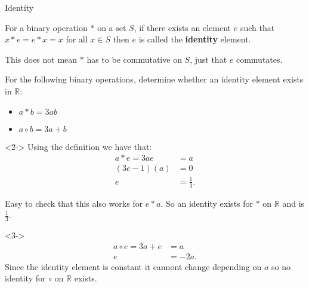 \documentclass[8pt]{beamer}
\newcommand{\R}{\mathbb{R}}
\begin{document}
\begin{frame}[shrink]{Identity}
	\begin{definition}
		For a binary operation $*$ on a set  $S$, if there exists an element $e$ such that $x*e=e*x=x$ for all  $x\in S$ then $e $ is called the \textbf{identity} element. 
	\end{definition}

	\alert<1>{This does not mean $*$ has to be commutative on  $S$, just that  $e$ commutates.}

\begin{problem}
	For the following binary operations, determine whether an identity element exists in $\R$:
	\begin{itemize}
		\item $a*b= 3ab$
		\item  $ a \circ b = 3a+b$
	\end{itemize}

\end{problem}

\begin{solution}<2->
	Using the definition we have that: 
	\begin{align*}
		a*e=3ae&=a \\
		(3e-1)(a)&=0 \\
		e&=\frac{1}{3}
	.\end{align*}

	Easy to check that this also works for $e*a$. So an identity exists for  $*$ on  $\R$ and is $\frac{1}{3}$.
\end{solution}

\begin{solution}<3->
	\begin{align*}
		a\circ e = 3a+e&= a \\
		e &= -2a 
	.\end{align*}
	Since the identity element is constant it cannont change depending on $a$ so no identity for  $\circ$ on  $\R$ exists.
\end{solution}


\end{frame}
\end{document}
